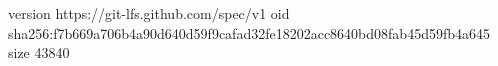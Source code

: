 version https://git-lfs.github.com/spec/v1
oid sha256:f7b669a706b4a90d640d59f9cafad32fe18202acc8640bd08fab45d59fb4a645
size 43840
